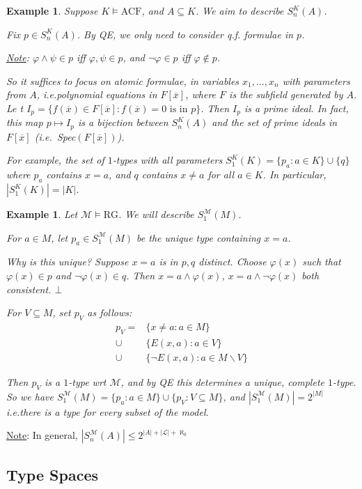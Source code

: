 \documentclass[]{article}
\theoremstyle{custhm}
\theoremstyle{cusdef}
\theoremstyle{custhm}
\theoremstyle{custhm}
\theoremstyle{custhm}
\theoremstyle{ex}
\newtheorem{ex}[theorem]{Example}
\theoremstyle{custhm}
\theoremstyle{cusdef}
\theoremstyle{remark}
\theoremstyle{remark}
\newcommand{\ie}{\textit{i.e.}}
\renewcommand{\L}{\mathcal{L}}
\newcommand{\M}{\mathcal{M}}
\renewcommand{\phi}{\varphi}
\renewcommand{\bar}{\overline}
\newcommand{\false}{\bot}
\newcommand{\acf}{\textrm{ACF}}
\newcommand{\rg}{\textrm{RG}}
\renewcommand{\subset}{\subseteq}
\begin{document}
\begin{ex}
Suppose $K\models \acf$, and $A\subset K$. We aim to describe $S_n^K(A)$.

Fix $p \in S_n^K(A)$. By QE, we only need to consider q.f. formulae in $p$.

\underline{Note}: $\phi\land \psi \in p$ iff $\phi,\psi \in p$, and $\neg \phi \in p$ iff $\phi \not\in p$.

So it suffices to focus on atomic formulae, in variables $x_1,\dots,x_n$ with parameters from $A$, \ie polynomial equations in $F[\bar{x}]$, where $F$ is the subfield generated by $A$. Le t $I_p = \{f(\bar{x})\in F[\bar{x}]:f(\bar{x}) = 0\textrm{ is in }p\}$. Then $I_p$ is a prime ideal. In fact, this map $p\mapsto I_p$ is a bijection between $S_n^K(A)$ and the set of prime ideals in $F[\bar{x}]$ (\ie\ Spec$(F[\bar{x}])$).

For example, the set of $1$-types with all parameters $S_1^K(K) = \{p_a:a\in K\}\cup\{q\}$ where $p_a$ contains $x = a$, and $q$ contains $x\ne a$ for all $a \in K$. In particular, $|S_1^K(K)| = |K|$.
\end{ex}
\begin{ex}
Let $\M\models \rg$. We will describe $S_1^\M(M)$.

For $a\in M$, let $p_a\in S_1^\M(M)$ be the unique type containing $x = a$.

Why is this unique? Suppose $x = a$ is in $p,q$ distinct. Choose $\phi(x)$ such that $\phi(x) \in p$ and $\neg\phi(x)\in q$. Then $x =a \land \phi(x)$, $x = a \land \neg\phi(x)$ both consistent. $\false$

For $V\subset M$, set $p_V$ as follows:
\begin{align*}
p_V =& \{x\ne a: a\in M\}\\
\cup&\{E(x,a):a\in V\}\\
\cup&\{\neg E(x,a):a\in M\backslash V\}
\end{align*}

Then $p_V$ is a $1$-type wrt $\M$, and by QE this determines a unique, complete $1$-type. So we have $S_1^\M(M) = \{p_a:a\in M\}\cup\{p_V:V\subset M\}$, and $|S_1^\M(M)| = 2^{|M|}$ \ie there is a type for every subset of the model.
\end{ex}
\underline{Note}: In general, $|S_n^\M(A)| \le 2^{|A| + |\L| + \aleph_0}$

\subsection{Type Spaces}
\end{document}
